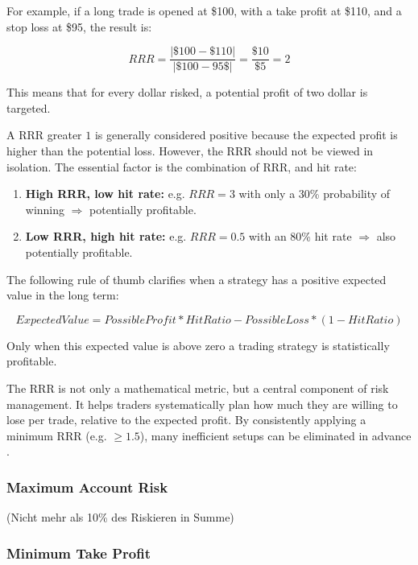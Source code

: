 For example, if a long trade is opened at \$100, with a take profit at \$110, and a stop loss at \$95, the result is:

\begin{equation}
    RRR = \frac{|\$100 - \$110|}{|\$100 - 95\$|} = \frac{\$10}{\$5} = 2
\end{equation}

This means that for every dollar risked, a potential profit of two dollar is targeted.

A RRR greater $1$ is generally considered positive because the expected profit is higher than the potential loss. However, the RRR should not be viewed in isolation. The essential factor is the combination of RRR, and hit rate:

\begin{enumerate}
    \item \textbf{High RRR, low hit rate:} e.g. $RRR=3$ with only a 30\% probability of winning $\Rightarrow$ potentially profitable.
    \item \textbf{Low RRR, high hit rate:} e.g. $RRR=0.5$ with an 80\% hit rate $\Rightarrow$ also potentially profitable.
\end{enumerate}

The following rule of thumb clarifies when a strategy has a positive expected value in the long term:

\begin{equation}
    ExpectedValue = PossibleProfit * HitRatio - PossibleLoss * (1 - HitRatio)
\end{equation}

Only when this expected value is above zero a trading strategy is statistically profitable.

The RRR is not only a mathematical metric, but a central component of risk management. It helps traders systematically plan how much they are willing to lose per trade, relative to the expected profit. By consistently applying a minimum RRR (e.g. $\ge 1.5$), many inefficient setups can be eliminated in advance \cite{bitpanda-crv}.

\subsubsection{Maximum Account Risk}

(Nicht mehr als 10\% des Riskieren in Summe)

\subsubsection{Minimum Take Profit}

